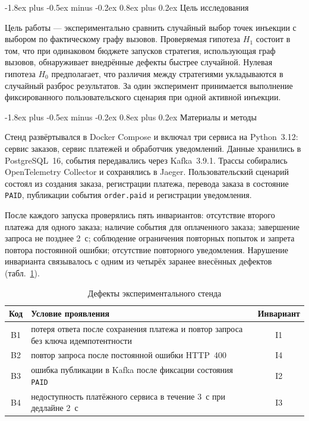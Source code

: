 \documentclass[10pt,a4paper]{article}
\makeatletter
\renewcommand\section{\@startsection{section}{1}{\z@}%
  {-1.8ex plus -0.5ex minus -0.2ex}%
  {0.8ex plus 0.2ex}%
  {\normalfont\Large\bfseries}}
\makeatother
\begin{document}
\section{Цель исследования}

Цель работы --- экспериментально сравнить случайный выбор точек инъекции с выбором по фактическому графу вызовов. Проверяемая гипотеза $H_1$ состоит в том, что при одинаковом бюджете запусков стратегия, использующая граф вызовов, обнаруживает внедрённые дефекты быстрее случайной. Нулевая гипотеза $H_0$ предполагает, что различия между стратегиями укладываются в случайный разброс результатов. За один эксперимент принимается выполнение фиксированного пользовательского сценария при одной активной инъекции.

\section{Материалы и методы}

Стенд развёртывался в Docker Compose и включал три сервиса на Python~3.12: сервис заказов, сервис платежей и обработчик уведомлений. Данные хранились в PostgreSQL~16, события передавались через Kafka~3.9.1. Трассы собирались OpenTelemetry Collector и сохранялись в Jaeger. Пользовательский сценарий состоял из создания заказа, регистрации платежа, перевода заказа в состояние \texttt{PAID}, публикации события \texttt{order.paid} и регистрации уведомления.

После каждого запуска проверялись пять инвариантов: отсутствие второго платежа для одного заказа; наличие события для оплаченного заказа; завершение запроса не позднее 2~с; соблюдение ограничения повторных попыток и запрета повтора постоянной ошибки; отсутствие повторного уведомления. Нарушение инварианта связывалось с одним из четырёх заранее внесённых дефектов (табл.~\ref{tab:defects}).

\begin{table}[ht]
  \centering
  \caption{Дефекты экспериментального стенда}
  \label{tab:defects}
  \begin{tabular}{c>{\raggedright\arraybackslash}p{}c}
    \toprule
    Код & Условие проявления & Инвариант \\
    \midrule
    B1 & потеря ответа после сохранения платежа и повтор запроса без ключа идемпотентности & I1 \\
    B2 & повтор запроса после постоянной ошибки HTTP~400 & I4 \\
    B3 & ошибка публикации в Kafka после фиксации состояния \texttt{PAID} & I2 \\
    B4 & недоступность платёжного сервиса в течение 3~с при дедлайне 2~с & I3 \\
    \bottomrule
  \end{tabular}
\end{table}
\end{document}
